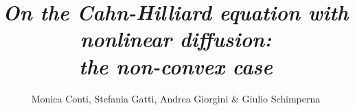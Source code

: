 \documentclass[11pt,reqno]{amsart}
\theoremstyle{remark}
\numberwithin{equation}{section}
\begin{document}
\title[Cahn-Hilliard equation with nonlinear diffusion]
{\emph{On the Cahn-Hilliard equation with nonlinear diffusion: \\ the non-convex case}}
\author[Monica Conti, Stefania Gatti, Andrea Giorgini \& Giulio Schimperna]{Monica Conti, Stefania Gatti, Andrea Giorgini \& Giulio Schimperna}

\address{Politecnico di Milano\\
Dipartimento di Matematica\\
Via E. Bonardi 9, I-20133 Milano, Italy \\
\href{mailto:monica.conti@polimi.it}{monica.conti@polimi.it},
\href{mailto:andrea.giorgini@polimi.it}{andrea.giorgini@polimi.it}}

\address{Università degli Studi di Modena e Reggio Emilia\\
Dipartimento di Scienze Fisiche, Informatiche e Matematiche\\
Via Campi 213/B, I-41125 Modena, Italy
\\
\href{mailto:stefania.gatti@unimore.it}{stefania.gatti@unimore.it}}

\address{Universit\`{a} degli Studi di Pavia\\
Dipartimento di Matematica ``F. Casorati", IMATI - C.N.R. \\
via Ferrata 5, 27100, Pavia, Italy \\
\href{mailto:giulio.schimperna@unipv.it}{giulio.schimperna@unipv.it}}


\end{document}
